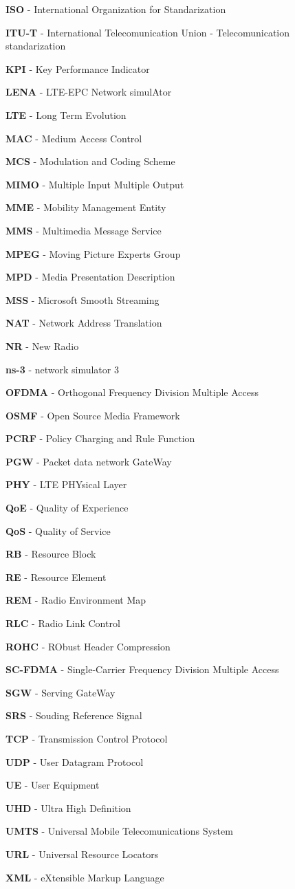 \textbf{ISO} - International Organization for Standarization

\textbf{ITU-T} - International Telecomunication Union - Telecomunication standarization

\textbf{KPI} - Key Performance Indicator

\textbf{LENA} - LTE-EPC Network simulAtor

\textbf{LTE} - Long Term Evolution

\textbf{MAC} - Medium Access Control

\textbf{MCS} - Modulation and Coding Scheme

\textbf{MIMO} - Multiple Input Multiple Output

\textbf{MME} - Mobility Management Entity

\textbf{MMS} - Multimedia Message Service

\textbf{MPEG} - Moving Picture Experts Group

\textbf{MPD} - Media Presentation Description

\textbf{MSS} - Microsoft Smooth Streaming

\textbf{NAT} - Network Address Translation

\textbf{NR} - New Radio

\textbf{ns-3} - network simulator 3

\textbf{OFDMA} - Orthogonal Frequency Division Multiple Access

\textbf{OSMF} - Open Source Media Framework

\textbf{PCRF} - Policy Charging and Rule Function

\textbf{PGW} - Packet data network GateWay

\textbf{PHY} - LTE PHYsical Layer

\textbf{QoE} - Quality of Experience

\textbf{QoS} - Quality of Service

\textbf{RB} - Resource Block

\textbf{RE} - Resource Element

\textbf{REM} - Radio Environment Map

\textbf{RLC} - Radio Link Control

\textbf{ROHC} - RObust Header Compression

\textbf{SC-FDMA} - Single-Carrier Frequency Division Multiple Access

\textbf{SGW} - Serving GateWay

\textbf{SRS} - Souding Reference Signal

\textbf{TCP} - Transmission Control Protocol

\textbf{UDP} - User Datagram Protocol

\textbf{UE} - User Equipment

\textbf{UHD} - Ultra High Definition

\textbf{UMTS} - Universal Mobile Telecomunications System

\textbf{URL} - Universal Resource Locators

\textbf{XML} - eXtensible Markup Language


\cleardoublepage
